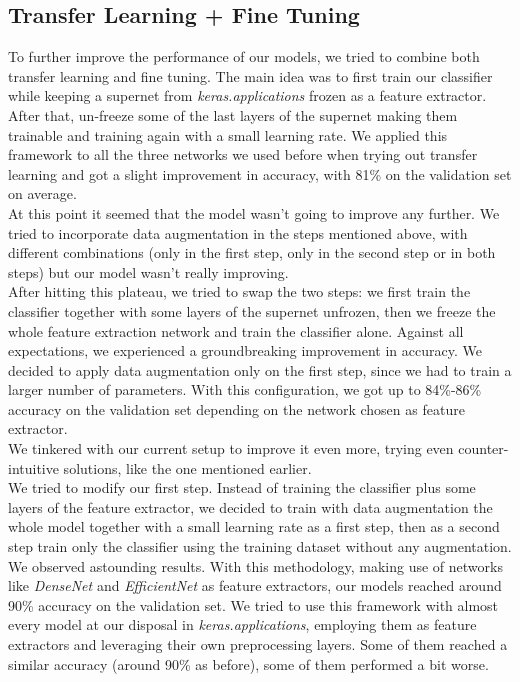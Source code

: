 \documentclass[11pt]{report}
\begin{document}
\subsection{Transfer Learning + Fine Tuning}
To further improve the performance of our models, we tried to combine both transfer learning and fine tuning. The main idea was to first train our classifier while keeping a supernet from \textit{keras.applications} frozen as a feature extractor. After that, un-freeze some of the last layers of the supernet making them trainable and training again with a small learning rate. We applied this framework to all the three networks we used before when trying out transfer learning and got a slight improvement in accuracy, with 81\% on the validation set on average. \\
At this point it seemed that the model wasn't going to improve any further. We tried to incorporate data augmentation in the steps mentioned above, with different combinations (only in the first step, only in the second step or in both steps) but our model wasn't really improving. \\
After hitting this plateau, we tried to swap the two steps: we first train the classifier together with some layers of the supernet unfrozen, then we freeze the whole feature extraction network and train the classifier alone. Against all expectations, we experienced a groundbreaking improvement in accuracy. We decided to apply data augmentation only on the first step, since we had to train a larger number of parameters. With this configuration, we got up to 84\%-86\% accuracy on the validation set depending on the network chosen as feature extractor. \\
We tinkered with our current setup to improve it even more, trying even counter-intuitive solutions, like the one mentioned earlier. \\
We tried to modify our first step. Instead of training the classifier plus some layers of the feature extractor, we decided to train with data augmentation the whole model together with a small learning rate as a first step, then as a second step train only the classifier using the training dataset without any augmentation. \\
We observed astounding results. With this methodology, making use of networks like \textit{DenseNet} and \textit{EfficientNet} as feature extractors, our models reached around 90\% accuracy on the validation set.
We tried to use this framework with almost every model at our disposal in \textit{keras.applications}, employing them as feature extractors and leveraging their own preprocessing layers. Some of them reached a similar accuracy (around 90\% as before), some of them performed a bit worse. \\
\end{document}
